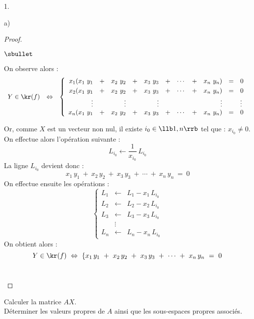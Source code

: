\documentclass[11pt]{article}%
\begin{document}
\begin{noliste}{1.}
\begin{noliste}{a)}
\begin{proof}
\begin{noliste}{$\sbullet$}
    
    On observe alors :
    \[
    \begin{array}{rcl}
      Y \in \kr(f) & \Leftrightarrow &
      \left\{
      \begin{array}{rrrrrrrrrcl}
       x_1(x_1 \ y_1 & + & x_2 \ y_2 & + & x_3 \ y_3 & + & 
       \cdots & + & x_n \ y_n) & = & 0
       \\[.1cm]
       x_2 (x_1 \ y_1 & + & x_2 \ y_2 & + & x_3 \ y_3 & + & 
       \cdots & + & x_n \ y_n) & = & 0
       \\[.1cm]
       \vdots & & \vdots & & \vdots & & & & \vdots & & \vdots
       \\
       x_n (x_1 \ y_1 & + & x_2 \ y_2 & + & x_3 \ y_3 & + & 
       \cdots & + & x_n \ y_n) & = & 0
      \end{array}
      \right.
     \end{array}
    \]

    Or, comme $X$ est un vecteur non nul, il existe $i_0\in 
    \llb 1,n \rrb$ tel que : $x_{i_0} \neq 0$.\\
    On effectue alors l'opération suivante :
    \[
      L_{i_0} \leftarrow \dfrac{1}{x_{i_0}} \, L_{i_0}
    \]
    La ligne $L_{i_0}$ devient donc :
    \[
      x_1 \, y_1 \ + \ x_2 \, y_2 \ + \ x_3 \, y_3 \ + \
      \cdots \ + \ x_n \, y_n \ = \ 0
    \]
    On effectue ensuite les opérations :
    \[
     \left\{
     \begin{array}{rcl}
      L_1 & \leftarrow & L_1 - x_1 \, L_{i_0}\\
      L_2 & \leftarrow & L_2 - x_2 \, L_{i_0}\\
      L_3 & \leftarrow & L_3 - x_3 \, L_{i_0}\\
       & \vdots & \\
      L_n & \leftarrow & L_n - x_n \, L_{i_0}
     \end{array}
     \right.
    \]
    On obtient alors :
    \[
     Y \in \kr(f) \ \Leftrightarrow \ 
     \left\{
      x_1 \, y_1 \ + \ x_2 \, y_2 \ + \ x_3 \, y_3 \ + \
      \cdots \ + \ x_n \, y_n \ = \ 0
      \right.
    \]
    ~\\[-1.4cm]
   \end{noliste}
  \end{proof}

  
  \item Calculer la matrice $AX$. \\
  Déterminer les valeurs propres de $A$ 
  ainsi que les sous-espaces propres associés.
  

\end{noliste}
\end{noliste}
\end{document}
